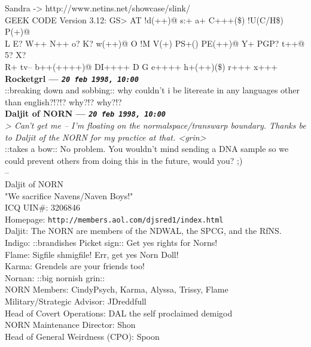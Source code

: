 \documentclass[11pt,twoside,a4paper]{article}
\begin{document}
\begin{multicols*}{2}
Sandra -> http://www.netins.net/showcase/slink/~\\
GEEK CODE Version 3.12: GS> AT !d(++)@ s:+ a+ C+++(\$) !U(C/H\$) P(+)@~\\
L E? W++ N++ o? K? w(++)@ O !M V(+) PS+() PE(++)@ Y+ PGP? t++@ 5? X?~\\
R+ tv-- b++(++++)@ DI++++ D G e++++ h+(++)(\$) r+++ x+++~\\

 
		
	
		
\textbf{Rocketgrl --- \emph{\texttt{20 feb 1998, 10:00}}}~\\

::breaking down and sobbing::  why couldn't i be litereate in any languages other than english?!?!?  why?!?  why?!?~\\

 
		
	
		
\textbf{Daljit of NORN --- \emph{\texttt{20 feb 1998, 10:00}}}~\\

\emph{> Can't get me -- I'm floating on the normalspace/transwarp boundary. Thanks be to Daljit of the NORN for my practice at that.  <grin>}~\\

::takes a bow::  No problem.  You wouldn't mind sending a DNA sample so we could prevent others from doing this in the future, would you?  ;)~\\

-- ~\\
Daljit of NORN~\\
"We sacrifice Navens/Naven Boys!"~\\
ICQ UIN\#:  3206846~\\
Homepage:  \texttt{http://members.aol.com/djsred1/index.html}~\\

Daljit:  The NORN are members of the NDWAL, the SPCG, and the RfNS.~\\
Indigo:  ::brandishes Picket sign::  Get yes rights for Norns!~\\
Flame:  Sigfile shmigfile!  Err, get yes Norn Doll!~\\
Karma:  Grendels are your friends too!~\\
Nornan:  ::big nornish grin::~\\

NORN Members:  CindyPsych, Karma, Alyssa, Trissy, Flame~\\
Military/Strategic Advisor:  JDreddfull~\\
Head of Covert Operations:  DAL the self proclaimed demigod~\\
NORN Maintenance Director:  Shon~\\
Head of General Weirdness (CPO):  Spoon~\\


\end{multicols*}
\end{document}
